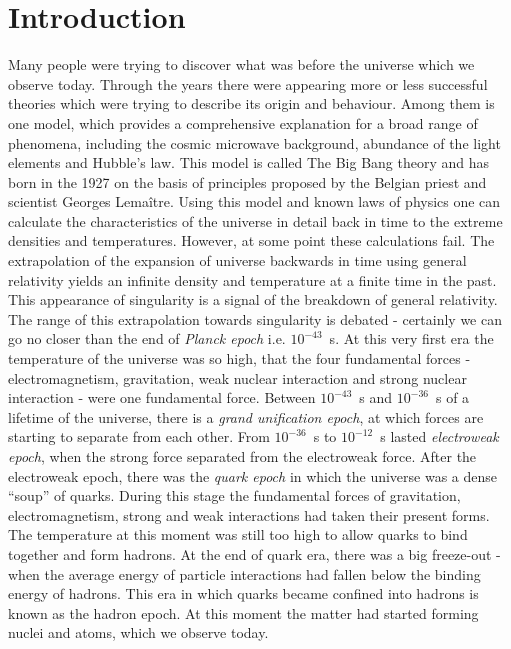 \chapter*{Introduction}
Many people were trying to discover what was before the universe which we observe today.
Through the years there were appearing more or less successful theories which were trying to describe its origin and behaviour.
Among them is one model, which provides a comprehensive explanation for a broad range of phenomena, including the cosmic microwave background, abundance of the light elements and Hubble's law.
This model is called The Big Bang theory and has born in the 1927 on the basis of principles proposed by the Belgian priest and scientist Georges Lema{\^i}tre.
Using this model and known laws of physics one can calculate the characteristics of the universe in detail back in time to the extreme densities and temperatures.
However, at some point these calculations fail.
The extrapolation of the expansion of universe backwards in time using general relativity yields an infinite density and temperature at a finite time in the past.
This appearance of singularity is a signal of the breakdown of general relativity.
The range of this extrapolation towards singularity is debated - certainly we can go no closer than the end of \textit{Planck epoch} i.e. $10^{-43}$~s.
At this very first era the temperature of the universe was so high, that the four fundamental forces - electromagnetism, gravitation, weak nuclear interaction and strong nuclear interaction - were one fundamental force.
Between $10^{-43}$~s and $10^{-36}$~s of a lifetime of the universe, there is a \textit{grand unification epoch}, at which forces are starting to separate from each other.
From $10^{-36}$~s to $10^{-12}$~s lasted \textit{electroweak epoch}, when the strong force separated from the electroweak force.
After the electroweak epoch, there was the \textit{quark epoch} in which the universe was a dense ``soup'' of quarks.
During this stage the fundamental forces of gravitation, electromagnetism, strong and weak interactions had taken their present forms. 
The temperature at this moment was still too high to allow quarks to bind together and form hadrons.
At the end of quark era, there was a big freeze-out - when the average energy of particle interactions had fallen below the binding energy of hadrons.
This era in which quarks became confined into hadrons is known as the hadron epoch.
At this moment the matter had started forming nuclei and atoms, which we observe today.

